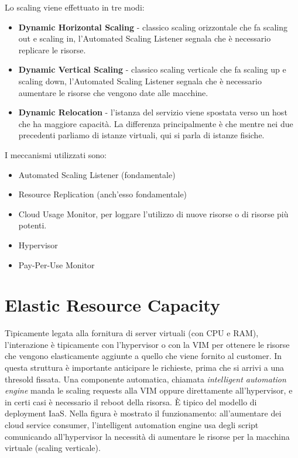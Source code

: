 Lo scaling viene effettuato in tre modi:
\begin{itemize}
    \item \textbf{Dynamic Horizontal Scaling} - classico scaling orizzontale che fa scaling out e scaling in, l'Automated Scaling Listener segnala che è necessario replicare le risorse.
    \item \textbf{Dynamic Vertical Scaling} - classico scaling verticale che fa scaling up e scaling down, l'Automated Scaling Listener segnala che è necessario aumentare le risorse che vengono date alle macchine.
    \item \textbf{Dynamic Relocation} - l'istanza del servizio viene spostata verso un host che ha maggiore capacità. La differenza principalmente è che mentre nei due precedenti parliamo di istanze virtuali, qui si parla di istanze fisiche.
\end{itemize}

I meccanismi utilizzati sono:
\begin{itemize}
    \item Automated Scaling Listener (fondamentale)
    \item Resource Replication (anch'esso fondamentale)
    \item Cloud Usage Monitor, per loggare l'utilizzo di nuove risorse o di risorse più potenti.
    \item Hypervisor
    \item Pay-Per-Use Monitor
\end{itemize}

\section{Elastic Resource Capacity}
Tipicamente legata alla fornitura di server virtuali (con CPU e RAM), l'interazione è tipicamente con l'hypervisor o con la VIM per ottenere le risorse che vengono elasticamente aggiunte a quello che viene fornito al customer. In questa struttura è importante anticipare le richieste, prima che si arrivi a una thresold fissata. Una componente automatica, chiamata \textit{intelligent automation engine} manda le scaling requests alla VIM oppure direttamente all'hypervisor, e in certi casi è necessario il reboot della risorsa. È tipico del modello di deployment IaaS. Nella figura è mostrato il funzionamento: all'aumentare dei cloud service consumer, l'intelligent automation engine usa degli script comunicando all'hypervisor la necessità di aumentare le risorse per la macchina virtuale (scaling verticale).

